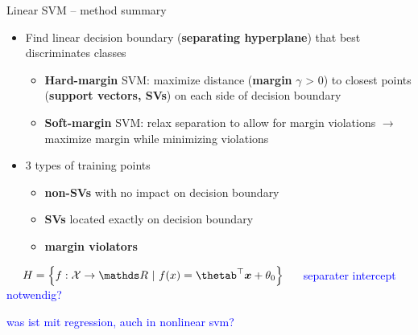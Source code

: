 \begin{vbframe}{Linear SVM -- method summary}

  
\medskip


\begin{itemize}
  \item Find linear decision boundary (\textbf{separating hyperplane}) that 
  best discriminates classes
  \begin{itemize}
    \item \textbf{Hard-margin} SVM: maximize distance (\textbf{margin} 
    $\gamma$ > 0) to closest points (\textbf{support vectors, SVs}) on each 
    side of decision boundary
    \item \textbf{Soft-margin} SVM: relax separation to allow for margin 
    violations $\rightarrow$ maximize margin while minimizing violations
  \end{itemize}
  \item 3 types of training points
  \begin{itemize}
    \item \textbf{non-SVs} with no impact on decision boundary
    \item \textbf{SVs} located exactly on decision boundary
    \item \textbf{margin violators}
  \end{itemize}
\end{itemize}

\medskip

 ~~
$\Hspace = \left\{f: \Xspace \to \R ~|~\fx = \thetab^\top \xv + \theta_0
\right\}$
 ~~ \textcolor{blue}{separater intercept notwendig?}
 
\medskip

\textcolor{blue}{was ist mit regression, auch in nonlinear svm?}

\framebreak


\end{vbframe}
